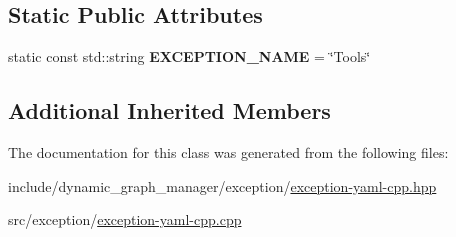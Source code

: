 \subsection*{Static Public Attributes}
\begin{DoxyCompactItemize}
\item 
static const std\+::string {\bfseries E\+X\+C\+E\+P\+T\+I\+O\+N\+\_\+\+N\+A\+ME} = \char`\"{}Tools\char`\"{}\hypertarget{classdynamic__graph_1_1ExceptionYamlCpp_a7d19bc2c6d36d26bd878795ea00bc63f}{}\label{classdynamic__graph_1_1ExceptionYamlCpp_a7d19bc2c6d36d26bd878795ea00bc63f}

\end{DoxyCompactItemize}
\subsection*{Additional Inherited Members}


The documentation for this class was generated from the following files\+:\begin{DoxyCompactItemize}
\item 
include/dynamic\+\_\+graph\+\_\+manager/exception/\hyperlink{exception-yaml-cpp_8hpp}{exception-\/yaml-\/cpp.\+hpp}\item 
src/exception/\hyperlink{exception-yaml-cpp_8cpp}{exception-\/yaml-\/cpp.\+cpp}\end{DoxyCompactItemize}
